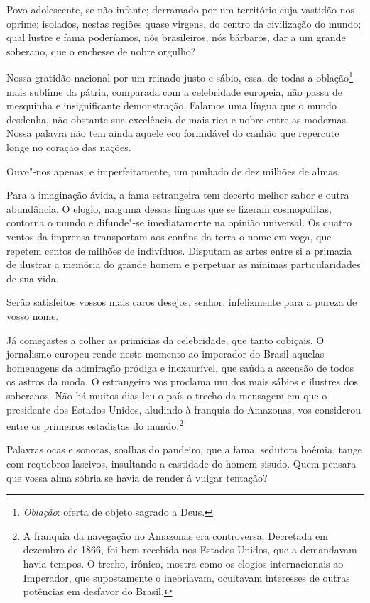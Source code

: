 Povo adolescente, se não infante; derramado por um território cuja
vastidão nos oprime; isolados, nestas regiões quase virgens, do centro
da civilização do mundo; qual lustre e fama poderíamos, nós
brasileiros, nós bárbaros, dar a um grande soberano, que o enchesse de
nobre orgulho? 

Nossa gratidão nacional por um reinado justo e sábio, essa, de todas a
oblação\footnote{ \textit{Oblação}: oferta de objeto sagrado a Deus.}
 mais sublime da pátria, comparada com a celebridade europeia, não passa
de mesquinha e insignificante demonstração. Falamos uma língua que o
mundo desdenha, não obstante sua excelência de mais rica e nobre entre
as modernas. Nossa palavra não tem ainda aquele eco formidável do
canhão que repercute longe no coração das nações.

Ouve"-nos apenas, e imperfeitamente, um punhado de dez milhões de almas.

Para a imaginação ávida, a fama estrangeira tem decerto melhor sabor e
outra abundância. O elogio, nalguma dessas línguas que se fizeram
cosmopolitas, contorna o mundo e difunde"-se imediatamente na opinião
universal. Os quatro ventos da imprensa transportam aos confins da
terra o nome em voga, que repetem centos de milhões de indivíduos.
Disputam as artes entre si a primazia de ilustrar a memória do grande
homem e perpetuar as mínimas particularidades de sua vida.

Serão satisfeitos vossos mais caros desejos, senhor, infelizmente para a
pureza de vosso nome.

Já começastes a colher as primícias da celebridade, que tanto cobiçais.
O jornalismo europeu rende neste momento ao imperador do Brasil aquelas
homenagens da admiração pródiga e inexaurível, que saúda a ascensão de
todos os astros da moda. O estrangeiro vos proclama um dos mais sábios
e ilustres dos soberanos. Não há muitos dias leu o país o trecho da
mensagem em que o presidente dos Estados Unidos, aludindo à franquia do
Amazonas, vos considerou entre os primeiros estadistas do
mundo.\footnote{ A franquia da navegação no Amazonas era controversa. 
Decretada em dezembro de 1866, foi bem recebida nos Estados Unidos, 
que a demandavam havia tempos. O trecho, irônico, mostra como os elogios 
internacionais ao Imperador, que supostamente o inebriavam, ocultavam 
interesses de outras potências em desfavor do Brasil.}

Palavras ocas e sonoras, soalhas do pandeiro, que a fama, sedutora
boêmia, tange com requebros lascivos, insultando a castidade do homem
sisudo. Quem pensara que vossa alma sóbria se havia de render à vulgar tentação? 

